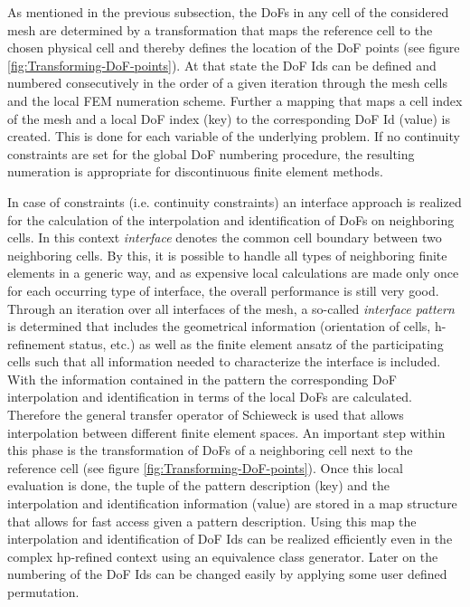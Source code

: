 As mentioned in the previous subsection, the DoFs in any cell of the
considered mesh are determined by a transformation that maps the
reference cell to the chosen physical cell and thereby defines the
location of the DoF points (see figure
\ref{fig:Transforming-DoF-points}).  At that state the DoF Ids can be
defined and numbered consecutively in the order of a given iteration
through the mesh cells and the local FEM numeration scheme. Further a
mapping that maps a cell index of the mesh and a local DoF index (key)
to the corresponding DoF Id (value) is created. This is done for each
variable of the underlying problem. If no continuity constraints are 
set for the global DoF numbering procedure, the resulting numeration is 
appropriate for discontinuous finite element methods.
\par
In case of constraints (i.e. continuity constraints) an interface 
approach is realized for the calculation of the interpolation and 
identification of DoFs on neighboring cells. In
this context \emph{interface} denotes the common cell boundary between
two neighboring cells. By this, it is possible to handle all types
of neighboring finite elements in a generic way, and as expensive
local calculations are made only once for each occurring type of interface,
the overall performance is still very good. Through an iteration over all 
interfaces of the mesh, a so-called \emph{interface pattern} is determined that includes the
geometrical information (orientation of cells, h-refinement status,
etc.) as well as the finite element ansatz of the participating cells
such that all information needed to characterize the interface is
included. With the information contained in the pattern the corresponding
DoF interpolation and identification in terms of the local DoFs are
calculated. Therefore the general transfer operator of Schieweck \cite{Schieweck}
is used that allows interpolation between different finite element
spaces. An important step within this phase is the transformation
of DoFs of a neighboring cell next to the reference cell (see figure
\ref{fig:Transforming-DoF-points}). Once this local evaluation is
done, the tuple of the pattern description (key) and the interpolation
and identification information (value) are stored in a map structure
that allows for fast access given a pattern description. Using this
map the interpolation and identification of DoF Ids can be realized
efficiently even in the complex hp-refined context using an equivalence
class generator. Later on the numbering of the
DoF Ids can be changed easily by applying some user defined permutation.



